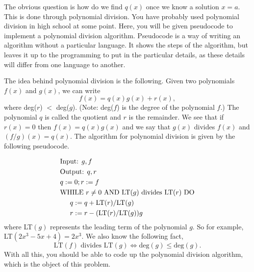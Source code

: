 \documentclass{article}
\def\prog#1{
\vspace{.1in}\begin{mdframed} \begin{center} \textbf{Programming Reminders} \end{center}#1 \end{mdframed} }
\begin{document}
	The obvious question is how do we find $q(x)$ once we know a solution $x=a$.  This is done through polynomial division.  You have probably used polynomial division in high school at some point.  Here, you will be given pseudocode to implement a polynomial division algorithm.  Pseudocode is a way of writing an algorithm without a particular language.  It shows the steps of the algorithm, but leaves it up to the programming to put in the particular details, as these details will differ from one language to another.
	
	The idea behind polynomial division is the following.  Given two polynomials $f(x)$ and $g(x)$, we can write
	\[ f(x) = q(x) g(x) + r(x),\]
	where deg($r$) $<$ deg($g$). (Note: deg($f$) is the degree of the polynomial $f$.)  The polynomial $q$ is called the quotient and $r$ is the remainder.  We see that if $r(x) = 0$ then $f(x) = q(x)g(x)$ and we say that $g(x)$ divides $f(x)$ and $(f/g)(x) = q(x)$.  The algorithm for polynomial division is given by the following pseudocode.
	
	\begin{align*}
		&\text{Input: } g, f \\
		 &\text{Output: } q, r \\
		 &q:=0; r:=f\\
		 &\text{WHILE } r \neq 0 \text{ AND LT}(g) \text{ divides LT} (r) \text{ DO} \\
		 &\hspace{.2in} q:=q + \text{LT}(r)/\text{LT}(g) \\
		 &\hspace{.2in} r:= r - (\text{LT}(r)/\text{LT}(g))g
	\end{align*}  
	where LT$(g)$ represents the leading term of the polynomial $g$.  So for example, LT$(2x^3 - 5x + 4) = 2x^3$.  We also know the following fact,
	\[ \text{LT}(f) \text{ divides LT}(g) \Leftrightarrow \text{deg}(g) \leq \text{deg}(g).\]
	With all this, you should be able to code up the polynomial division algorithm, which is the object of this problem.
	
 
 	
 	
 	
 	
 	
 	
 	

	
	
	
	
	
	
	
	
\end{document}
